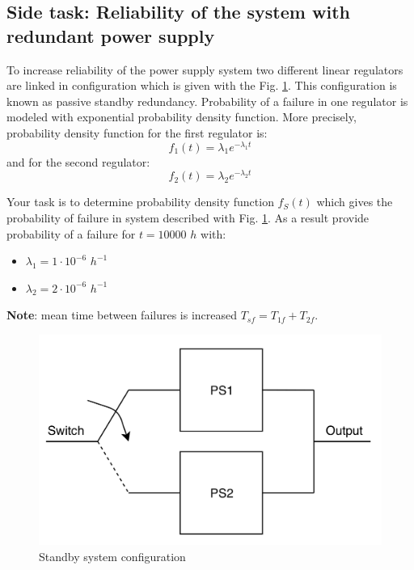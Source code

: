 \documentclass[a4paper]{article}
\begin{document}
\subsection{Side task: Reliability of the system with redundant power supply} 
\label{ele:task:3}
To increase reliability of the power supply system two different linear 
regulators are linked in configuration which is given with the Fig. 
\ref{fig:psc}. This configuration is known as passive standby redundancy. 
Probability of a failure in one regulator is modeled with exponential 
probability density function. More precisely, probability density function for 
the first regulator is:  
\begin{equation}
f_1(t) = \lambda_1 e^{-\lambda_1 t}
\end{equation}
and for the second regulator:
\begin{equation}
f_2(t) = \lambda_2 e^{-\lambda_2 t}
\end{equation}

Your task is to determine probability density function $f_S(t)$ which gives the
probability of failure in system described with Fig. \ref{fig:psc}. As a result 
provide probability of a failure for $t = 10000$ $h$ with:
\begin{itemize}
\item[] $\lambda_1 = 1 \cdot10^{-6}$ $h^{-1}$
\item[] $\lambda_2 = 2 \cdot10^{-6}$ $h^{-1}$ 
\end{itemize} 

\textbf{Note}: mean time between failures is increased $T_{sf} = 
T_{1f} + T_{2f}$. 

\begin{figure}[h!]
\centering
\includegraphics[width=\linewidth]{images/standby.png}
\caption{Standby system configuration}
\label{fig:psc}
\end{figure}
\end{document}
